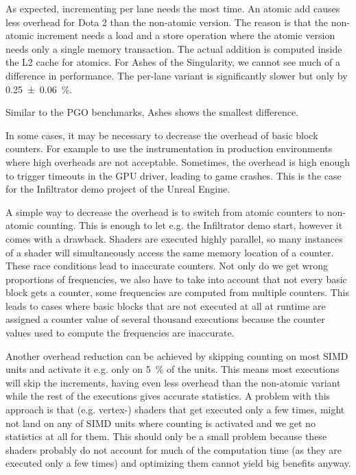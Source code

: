 As expected, incrementing per lane needs the most time. An atomic add causes less overhead for Dota 2 than the non-atomic version.
The reason is that the non-atomic increment needs a load and a store operation where the atomic version needs only a single memory transaction. The actual addition is computed inside the L2 cache for atomics.
For Ashes of the Singularity, we cannot see much of a difference in performance. The per-lane variant is significantly slower but only by \SI{0.25 \pm 0.06}{\percent}.



Similar to the PGO benchmarks, Ashes shows the smallest difference.

\begin{table}
\centering
{}
\label{tab:overhead}
\end{table}


In some cases, it may be necessary to decrease the overhead of basic block counters. For example to use the instrumentation in production environments where high overheads are not acceptable.
Sometimes, the overhead is high enough to trigger timeouts in the GPU driver, leading to game crashes. This is the case for the Infiltrator demo project of the Unreal Engine.

A simple way to decrease the overhead is to switch from atomic counters to non-atomic counting. This is enough to let e.g. the Infiltrator demo start, however it comes with a drawback. Shaders are executed highly parallel, so many instances of a shader will simultaneously access the same memory location of a counter.
These race conditions lead to inaccurate counters. Not only do we get wrong proportions of frequencies, we also have to take into account that not every basic block gets a counter, some frequencies are computed from multiple counters. This leads to cases where basic blocks that are not executed at all at runtime are assigned a counter value of several thousand executions because the counter values used to compute the frequencies are inaccurate.

Another overhead reduction can be achieved by skipping counting on most SIMD units and activate it e.g. only on \SI{5}{\percent} of the units.
This means most executions will skip the increments, having even less overhead than the non-atomic variant while the rest of the executions gives accurate statistics.
A problem with this approach is that (e.g. vertex-) shaders that get executed only a few times, might not land on any of SIMD units where counting is activated and we get no statistics at all for them.
This should only be a small problem because these shaders probably do not account for much of the computation time (as they are executed only a few times) and optimizing them cannot yield big benefits anyway.

